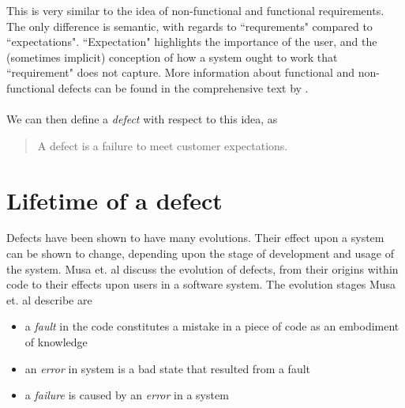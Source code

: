 This is very similar to the idea of non-functional and functional requirements.
The only difference is semantic, with regards to ``requrements" compared to ``expectations".
``Expectation" highlights the importance of the user, and the (sometimes implicit) conception of
how a system ought to work that ``requirement" does not capture.
More information about functional and non-functional defects can be found in the comprehensive
text by \FIXME.\\
\\
We can then define a {\em defect} with respect to this idea, as
\begin{quote}
	A defect is a failure to meet customer expectations.
\end{quote}

\section{Lifetime of a defect} \label{sec:defect:lifetime}

Defects have been shown to have many evolutions.
Their effect upon a system can be shown to change, depending upon the stage of development and
usage of the system.
Musa et. al \cite{musa1987software} discuss the evolution of defects, from their origins within
code to their effects upon users in a software system.
The evolution stages Musa et. al describe are
\begin{itemize}
	\item a {\em fault} in the code constitutes a mistake in a piece of code as an embodiment of
		knowledge
	\item an {\em error} in system is a bad state that resulted from a fault
	\item a {\em failure} is caused by an {\em error} in a system
\end{itemize}


